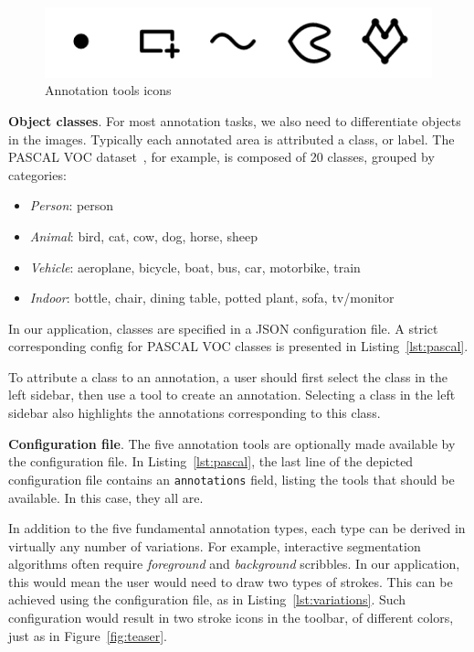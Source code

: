 \begin{figure}[ht]
\centering
\includegraphics[width=0.8\columnwidth]{assets/img/annotation-tools.png}
\caption{Annotation tools icons}%
\label{fig:icons}
\end{figure}


\textbf{Object classes}.
For most annotation tasks, we also need to differentiate objects in the images.
Typically each annotated area is attributed a class, or label.
The PASCAL VOC dataset~\cite{everingham2010pascal}, for example,
is composed of 20 classes, grouped by categories:
\begin{itemize}
\item \textit{Person}: person
\item \textit{Animal}: bird, cat, cow, dog, horse, sheep
\item \textit{Vehicle}: aeroplane, bicycle, boat, bus, car, motorbike, train
\item \textit{Indoor}: bottle, chair, dining table, potted plant, sofa, tv/monitor
\end{itemize}

In our application, classes are specified in a JSON configuration file.
A strict corresponding config for PASCAL VOC classes
is presented in Listing~\ref{lst:pascal}.



To attribute a class to an annotation,
a user should first select the class in the left sidebar,
then use a tool to create an annotation.
Selecting a class in the left sidebar also highlights the annotations
corresponding to this class.


\textbf{Configuration file}.
The five annotation tools are optionally made available by the configuration file.
In Listing~\ref{lst:pascal}, the last line of the depicted configuration file
contains an \texttt{annotations} field, listing the tools that should be available.
In this case, they all are.

In addition to the five fundamental annotation types,
each type can be derived in virtually any number of variations.
For example, interactive segmentation algorithms often require
\textit{foreground} and \textit{background} scribbles.
In our application, this would mean the user would need to draw two types of strokes.
This can be achieved using the configuration file,
as in Listing~\ref{lst:variations}.
Such configuration would result in two stroke icons in the toolbar,
of different colors, just as in Figure~\ref{fig:teaser}.

